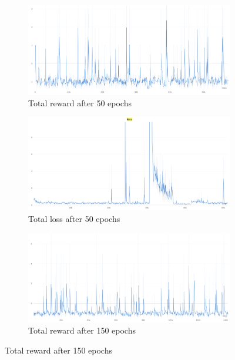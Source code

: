 \documentclass{scrartcl}
\begin{document}
\begin{figure}
  \centering
  \begin{subfigure}[b]{0.45\textwidth}
      \centering
      \includegraphics[width=\textwidth]{img/rewards_50_epochs.png}
      \caption{Total reward after 50 epochs}
      \label{fig:g}
  \end{subfigure}
  \hfill
  \begin{subfigure}[b]{0.45\textwidth}
      \centering
      \includegraphics[width=\textwidth]{img/loss_50_epochs.png}
      \caption{Total loss after 50 epochs}
      \label{fig:h}
  \end{subfigure}
  \hfill
  \begin{subfigure}[b]{0.45\textwidth}
      \centering
      \includegraphics[width=\textwidth]{img/rewards.png}
      \caption{Total reward after 150 epochs} 

\end{subfigure}
\end{figure}
\end{document}
